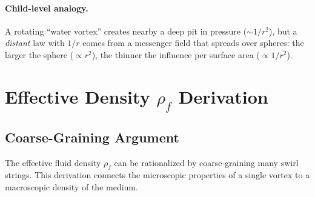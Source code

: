 \documentclass[10pt,reprint,aps,onecolumn,nofootinbib]{revtex4-2}
\begin{document}
    \paragraph{Child-level analogy.}
    A rotating ``water vortex'' creates nearby a deep pit in pressure ($\sim 1/r^2$),
    but a \emph{distant} law with $1/r$ comes from a messenger field that spreads over spheres:
    the larger the sphere ($\propto r^2$), the thinner the influence per surface area ($\propto 1/r^2$).


    \section{Effective Density $\rho_f$ Derivation}
        \subsection{Coarse-Graining Argument}
            The effective fluid density $\rho_f$ can be rationalized by coarse-graining many swirl strings. This derivation connects the microscopic properties of a single vortex to a macroscopic density of the medium.
\end{document}
